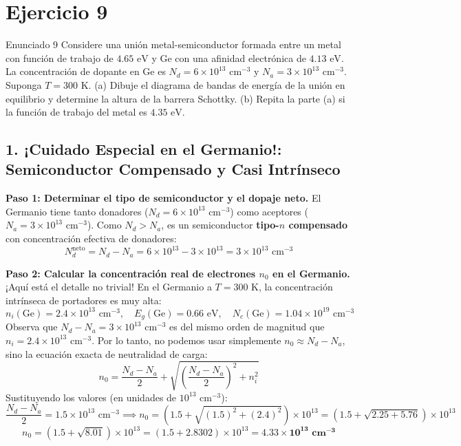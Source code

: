 \documentclass[11pt,a4paper]{article}
\begin{document}
\section*{Ejercicio 9}
\begin{ejerciciobox}{Enunciado 9}
Considere una unión metal-semiconductor formada entre un metal con función de trabajo de $4.65\text{ eV}$ y Ge con una afinidad electrónica de $4.13\text{ eV}$. La concentración de dopante en Ge es $N_d = 6 \times 10^{13}\text{ cm}^{-3}$ y $N_a = 3 \times 10^{13}\text{ cm}^{-3}$. Suponga $T = 300\text{ K}$. (a) Dibuje el diagrama de bandas de energía de la unión en equilibrio y determine la altura de la barrera Schottky. (b) Repita la parte (a) si la función de trabajo del metal es $4.35\text{ eV}$.
\end{ejerciciobox}

\subsection*{1. ¡Cuidado Especial en el Germanio!: Semiconductor Compensado y Casi Intrínseco}
\textbf{Paso 1: Determinar el tipo de semiconductor y el dopaje neto.}
El Germanio tiene tanto donadores ($N_d = 6 \times 10^{13}\text{ cm}^{-3}$) como aceptores ($N_a = 3 \times 10^{13}\text{ cm}^{-3}$). Como $N_d > N_a$, es un semiconductor \textbf{tipo-$n$ compensado} con concentración efectiva de donadores:
\[
N_d^{\text{neto}} = N_d - N_a = 6 \times 10^{13} - 3 \times 10^{13} = 3 \times 10^{13}\text{ cm}^{-3}
\]

\textbf{Paso 2: Calcular la concentración real de electrones $n_0$ en el Germanio.}
¡Aquí está el detalle no trivial! En el Germanio a $T = 300\text{ K}$, la concentración intrínseca de portadores es muy alta:
\[
n_i(\text{Ge}) = 2.4 \times 10^{13}\text{ cm}^{-3}, \quad E_g(\text{Ge}) = 0.66\text{ eV}, \quad N_c(\text{Ge}) = 1.04 \times 10^{19}\text{ cm}^{-3}
\]
Observa que $N_d - N_a = 3 \times 10^{13}\text{ cm}^{-3}$ es del mismo orden de magnitud que $n_i = 2.4 \times 10^{13}\text{ cm}^{-3}$. Por lo tanto, no podemos usar simplemente $n_0 \approx N_d - N_a$, sino la ecuación exacta de neutralidad de carga:
\[
n_0 = \frac{N_d - N_a}{2} + \sqrt{\left(\frac{N_d - N_a}{2}\right)^2 + n_i^2}
\]
Sustituyendo los valores (en unidades de $10^{13}\text{ cm}^{-3}$):
\[
\frac{N_d - N_a}{2} = 1.5 \times 10^{13}\text{ cm}^{-3} \implies n_0 = \left( 1.5 + \sqrt{(1.5)^2 + (2.4)^2} \right) \times 10^{13} = \left( 1.5 + \sqrt{2.25 + 5.76} \right) \times 10^{13}
\]
\[
n_0 = \left( 1.5 + \sqrt{8.01} \right) \times 10^{13} = (1.5 + 2.8302) \times 10^{13} = \mathbf{4.33 \times 10^{13}\text{ cm}^{-3}}
\]
\end{document}
